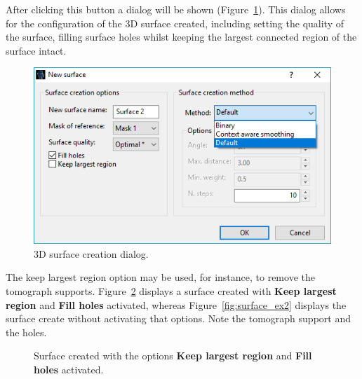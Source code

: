 After clicking this button a dialog will be shown (Figure~\ref{fig:create_surface_1}). This dialog allows for the configuration of the 3D surface created, including setting the quality of the surface, filling surface holes whilst keeping the largest connected region of the surface intact.

\begin{figure}[!htb]
\centering
\includegraphics[scale=0.5]{../user_guide_figures/invesalius_screen/surface_config_window_en.png}
\caption{3D surface creation dialog.}
\label{fig:create_surface_1}
\end{figure}

The keep largest region option may be used, for instance, to remove the tomograph supports. Figure~\ref{fig:surface_ex1} displays a surface created with \textbf{Keep largest region} and \textbf{Fill holes} activated, whereas Figure~\ref{fig:surface_ex2} displays the surface create without activating that options. Note the tomograph support and the holes.

\begin{figure}[!htb]
  \centering
  \caption{Surface created with the options \textbf{Keep largest region} and \textbf{Fill holes} activated.}
  \label{fig:surface_ex1}
\end{figure}

